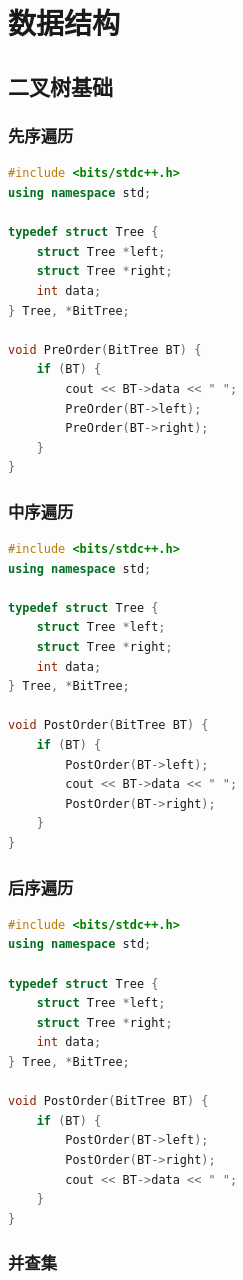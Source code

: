 \section{数据结构}

\subsection{二叉树基础}
\subsubsection{先序遍历}
\begin{lstlisting}[language=c++,caption={先序遍历}]
#include <bits/stdc++.h>
using namespace std;

typedef struct Tree {
	struct Tree *left;
	struct Tree *right;
	int data;
} Tree, *BitTree;

void PreOrder(BitTree BT) {
	if (BT) {
		cout << BT->data << " ";
		PreOrder(BT->left);
		PreOrder(BT->right);
	}
}
\end{lstlisting}

\subsubsection{中序遍历}

\begin{lstlisting}[language=c++,caption={中序遍历}]
#include <bits/stdc++.h>
using namespace std;

typedef struct Tree {
	struct Tree *left;
	struct Tree *right;
	int data;
} Tree, *BitTree;

void PostOrder(BitTree BT) {
	if (BT) {
		PostOrder(BT->left);
		cout << BT->data << " ";
		PostOrder(BT->right);
	}
}
\end{lstlisting}


\subsubsection{后序遍历}
\begin{lstlisting}[language=c++,caption={后序遍历}]
#include <bits/stdc++.h>
using namespace std;

typedef struct Tree {
	struct Tree *left;
	struct Tree *right;
	int data;
} Tree, *BitTree;

void PostOrder(BitTree BT) {
	if (BT) {
		PostOrder(BT->left);
		PostOrder(BT->right);
		cout << BT->data << " ";
	}
}
\end{lstlisting}

\subsubsection{并查集}


